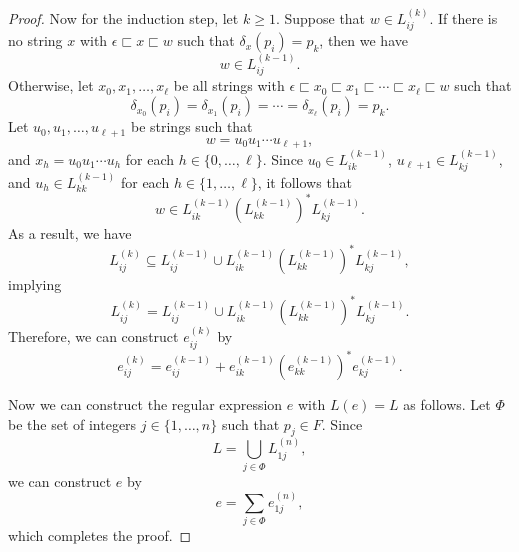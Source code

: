 \begin{proof}
  Now for the induction step, let $k \geq 1$.
  Suppose that $w \in L_{ij}^{(k)}$.
  If there is no string $x$ with $\epsilon \sqsubset x \sqsubset w$
  such that $\delta_x(p_i) = p_k$, then we have
  \begin{equation*}
    w \in L_{ij}^{(k-1)}.
  \end{equation*}
  Otherwise, let $x_0, x_1, \dots, x_\ell$ be all strings with
  $\epsilon \sqsubset x_0 \sqsubset x_1 \sqsubset \cdots \sqsubset x_\ell
  \sqsubset w$ such that
  \begin{equation*}
    \delta_{x_0}(p_i)
    = \delta_{x_1}(p_i)
    = \cdots
    = \delta_{x_\ell}(p_i)
    = p_k.
  \end{equation*}
  Let $u_0, u_1, \dots, u_{\ell+1}$ be strings such that
  \begin{equation*}
    w = u_0u_1 \cdots u_{\ell+1},
  \end{equation*}
  and $x_h = u_0u_1 \cdots u_h$ for each $h \in \{0, \dots, \ell\}$.
  Since $u_0 \in L_{ik}^{(k-1)}$, $u_{\ell+1} \in L_{kj}^{(k-1)}$, and
  $u_h \in L_{kk}^{(k-1)}$ for each $h \in \{1, \dots, \ell\}$,
  it follows that
  \begin{equation*}
    w \in L_{ik}^{(k-1)}\left(L_{kk}^{(k-1)}\right)^*L_{kj}^{(k-1)}.
  \end{equation*}
  As a result, we have
  \begin{equation*}
    L_{ij}^{(k)} \subseteq L_{ij}^{(k-1)} \cup
    L_{ik}^{(k-1)}\left(L_{kk}^{(k-1)}\right)^*L_{kj}^{(k-1)},
  \end{equation*}
  implying
  \begin{equation*}
    L_{ij}^{(k)} = L_{ij}^{(k-1)} \cup
    L_{ik}^{(k-1)}\left(L_{kk}^{(k-1)}\right)^*L_{kj}^{(k-1)}.
  \end{equation*}
  Therefore, we can construct $e_{ij}^{(k)}$ by
  \begin{equation*}
    e_{ij}^{(k)} = e_{ij}^{(k-1)}
    + e_{ik}^{(k-1)}\left(e_{kk}^{(k-1)}\right)^*e_{kj}^{(k-1)}.
  \end{equation*}

  Now we can construct the regular expression $e$ with $L(e) = L$ as follows.
  Let $\Phi$ be the set of integers $j \in \{1, \dots, n\}$ such that
  $p_j \in F$.
  Since
  \begin{equation*}
    L = \bigcup_{j \in \Phi} L_{1j}^{(n)},
  \end{equation*}
  we can construct $e$ by
  \begin{equation*}
    e = \sum_{j \in \Phi} e_{1j}^{(n)},
  \end{equation*}
  which completes the proof.
\end{proof}